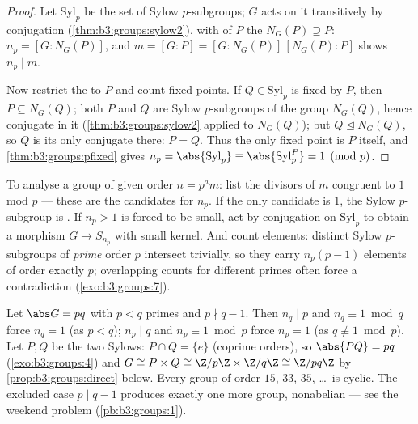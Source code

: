\begin{proof}
Let $\mathrm{Syl}_p$ be the set of Sylow $p$-subgroups; $G$ acts on
it transitively by conjugation (\cref{thm:b3:groups:sylow2}), with
 of $P$ the  $N_G(P) \supseteq P$: $n_p = [G :
N_G(P)]$, and $m = [G:P] = [G:N_G(P)]\,[N_G(P):P]$ shows $n_p \mid
m$.

Now restrict the  to $P$ and count fixed points. If $Q \in
\mathrm{Syl}_p$ is fixed by $P$, then $P \subseteq N_G(Q)$; both
$P$ and $Q$ are Sylow $p$-subgroups of the group $N_G(Q)$, hence
conjugate in it (\cref{thm:b3:groups:sylow2} applied to $N_G(Q)$);
but $Q \trianglelefteq N_G(Q)$, so $Q$ is its only conjugate there:
$P = Q$. Thus the only fixed point is $P$ itself, and
\cref{thm:b3:groups:pfixed} gives $n_p = \abs{\mathrm{Syl}_p}
\equiv \abs{\mathrm{Syl}_p^P} = 1 \pmod p$.
\end{proof}

\begin{method}\label{met:b3:groups:sylowmethod}
To analyse a group of given order $n = p^a m$: list the divisors
of $m$ congruent to $1$ mod $p$ --- these are the candidates for
$n_p$. If the only candidate is $1$, the Sylow $p$-subgroup is
. If $n_p > 1$ is forced to be small, act by conjugation on
$\mathrm{Syl}_p$ to obtain a morphism $G \to S_{n_p}$ with small
kernel. And count elements: distinct Sylow $p$-subgroups of
\emph{prime} order $p$ intersect trivially, so they carry
$n_p(p-1)$ elements of order exactly $p$; overlapping counts for
different primes often force a contradiction
(\cref{exo:b3:groups:7}).
\end{method}

\begin{example}\label{ex:b3:groups:pq}
Let $\abs G = pq$ with $p < q$ primes and $p \nmid q - 1$. Then
$n_q \mid p$ and $n_q \equiv 1 \bmod q$ force $n_q = 1$ (as $p <
q$); $n_p \mid q$ and $n_p \equiv 1 \bmod p$ force $n_p = 1$ (as $q
\not\equiv 1 \bmod p$). Let $P, Q$ be the two  Sylows: $P
\cap Q = \{e\}$ (coprime orders), so $\abs{PQ} = pq$
(\cref{exo:b3:groups:4}) and $G \cong P \times Q \cong \Z/p\Z
\times \Z/q\Z \cong \Z/pq\Z$ by
\cref{prop:b3:groups:direct} below. Every group of order $15$,
$33$, $35$, \dots\ is cyclic. The excluded case $p \mid q - 1$
produces exactly one more group, nonabelian --- see the weekend
problem (\cref{pb:b3:groups:1}).
\end{example}

